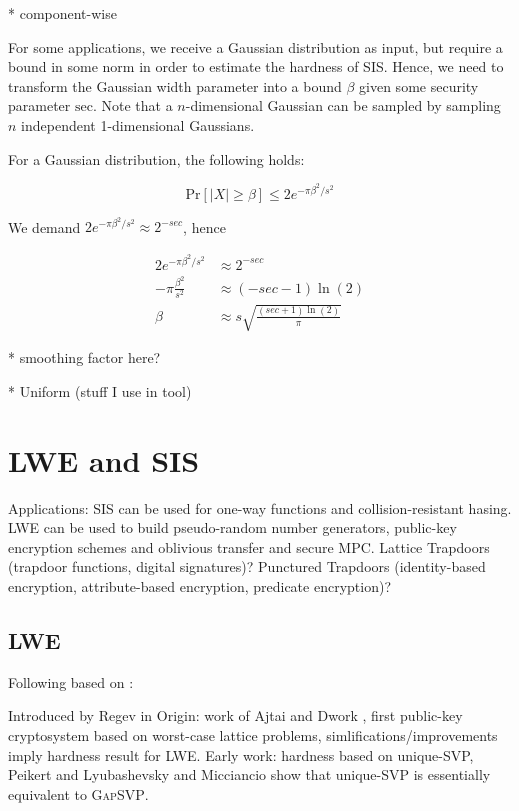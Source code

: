 \documentclass[
  a4paper,  %
  twoside,  %
  bibliography=totoc,
  headsepline,
  cleardoublepage=empty,
  parskip=half,
  draft=false
]{scrbook}
\begin{document}
    * component-wise
    

    For some applications, we receive a Gaussian distribution as input, but require a bound in some norm in order to estimate the hardness of SIS. Hence, we need to transform the Gaussian width parameter into a bound $\beta$ given some security parameter $\text{sec}$. Note that a $n$-dimensional Gaussian can be sampled by sampling $n$ independent 1-dimensional Gaussians. %
        
    For a Gaussian distribution, the following holds: 
    
    \begin{equation}
      \text{Pr}\left[ |X| \geq \beta \right] \leq 2 e^{-\pi \beta^2/s^2}
    \end{equation}
    
    We demand $2 e^{-\pi \beta^2/s^2} \approx 2^{-sec}$, hence
    
    \begin{align*}
      2 e^{-\pi \beta^2/s^2} &\approx 2^{-sec}\\
      -\pi \frac{\beta^2}{s^2} &\approx (-sec - 1)\ln (2)\\
      \beta  &\approx s \sqrt{\frac{(sec + 1) \ln(2)}{\pi}}
    \end{align*}


    * smoothing factor here?

    * Uniform (stuff I use in tool)







\section{LWE and SIS}
Applications: SIS can be used for one-way functions and collision-resistant hasing. LWE can be used to build pseudo-random number generators, public-key encryption schemes and oblivious transfer and secure MPC. Lattice Trapdoors (trapdoor functions, digital signatures)? Punctured Trapdoors (identity-based encryption, attribute-based encryption, predicate encryption)? %

\subsection{LWE}
Following based on \cite{Reg10}:%

Introduced by Regev in \cite{Reg09}
Origin: work of Ajtai and Dwork \cite{AD97}, first public-key cryptosystem based on worst-case lattice problems, simlifications/improvements \cite{GGH97b, Reg03} imply hardness result for LWE. 
Early work: hardness based on unique-SVP, Peikert \cite{Pei09} and Lyubashevsky and Micciancio \cite{LM09} show that unique-SVP is essentially equivalent to \textsc{GapSVP}.
\end{document}
